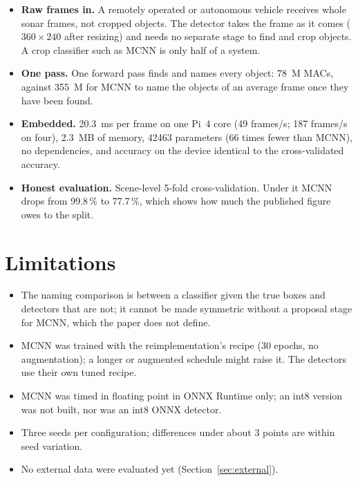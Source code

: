 \documentclass[11pt,a4paper]{article}
\begin{document}
\begin{itemize}
  \item \textbf{Raw frames in.} A remotely operated or autonomous vehicle
        receives whole sonar frames, not cropped objects. The detector
        takes the frame as it comes ($360 \times 240$ after
        resizing) and needs no separate stage to find and crop objects.
        A crop classifier such as MCNN is only half of a system.
  \item \textbf{One pass.} One forward pass finds and names every object:
        78~M MACs, against 355~M for MCNN to name the objects of an average
        frame once they have been found.
  \item \textbf{Embedded.} 20.3~ms per frame on one Pi~4 core (49 frames/s;
        187 frames/s on four), 2.3~MB of memory, \num{42463} parameters
        (66 times fewer than MCNN), no dependencies, and accuracy on the
        device identical to the cross-validated accuracy.
  \item \textbf{Honest evaluation.} Scene-level 5-fold cross-validation.
        Under it MCNN drops from 99.8\,\% to 77.7\,\%, which shows how much
        the published figure owes to the split.
\end{itemize}

\section{Limitations}

\begin{itemize}
  \item The naming comparison is between a classifier given the true boxes
        and detectors that are not; it cannot be made symmetric without a
        proposal stage for MCNN, which the paper does not define.
  \item MCNN was trained with the reimplementation's recipe (30 epochs, no
        augmentation); a longer or augmented schedule might raise it. The
        detectors use their own tuned recipe.
  \item MCNN was timed in floating point in ONNX Runtime only; an int8
        version was not built, nor was an int8 ONNX detector.
  \item Three seeds per configuration; differences under about 3 points are
        within seed variation.
  \item No external data were evaluated yet (Section~\ref{sec:external}).
\end{itemize}
\end{document}
